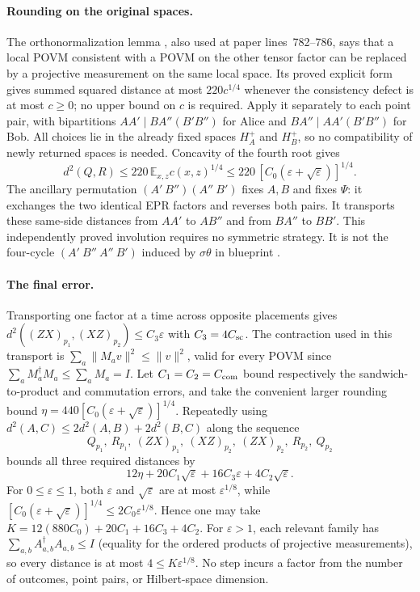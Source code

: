 \documentclass[11pt]{article}
\begin{document}
\paragraph{Rounding on the original spaces.}
The orthonormalization lemma , also used at paper
lines~782--786, says that a local POVM consistent with a POVM on the other
tensor factor can be replaced by a projective measurement on the same local
space.  Its proved explicit form gives summed squared distance at most
$220c^{1/4}$ whenever the consistency defect is at most $c\geq0$; no upper
bound on $c$ is required.  Apply it separately to each point pair, with
bipartitions $AA'\mid BA''(B'B'')$ for Alice and
$BA''\mid AA'(B'B'')$ for Bob.  All choices lie in the already fixed spaces
$H_A^+$ and $H_B^+$, so no compatibility of newly returned spaces is needed.
Concavity of the fourth root gives
\[
 d^2(Q,R)\leq220\,\mathbb E_{x,z}c(x,z)^{1/4}
 \leq220\,[C_0(\varepsilon+\sqrt\varepsilon)]^{1/4}.
\]
The ancillary permutation $(A'\ B'')(A''\ B')$ fixes $A,B$ and fixes
$\Psi$: it exchanges the two identical EPR factors and reverses both pairs.
It transports these same-side distances from $AA'$ to $AB''$ and from $BA''$
to $BB'$.  This independently proved involution requires no symmetric
strategy.  It is not the four-cycle $(A'\ B''\ A''\ B')$ induced by
$\sigma\theta$ in blueprint .

\paragraph{The final error.}
Transporting one factor at a time across opposite placements gives
$d^2((ZX)_{p_1},(XZ)_{p_2})\leq C_3\varepsilon$ with $C_3=4C_{\rm sc}$.
The contraction used in this transport is
$\sum_a\|M_av\|^2\leq\|v\|^2$, valid for every POVM since
$\sum_a M_a^\dagger M_a\leq\sum_a M_a=I$.
Let $C_1=C_2=C_{\rm com}$ bound respectively the sandwich-to-product and
commutation errors, and take the convenient larger rounding bound
$\eta=440[C_0(\varepsilon+\sqrt\varepsilon)]^{1/4}$.
Repeatedly using $d^2(A,C)\leq2d^2(A,B)+2d^2(B,C)$ along the sequence
\[
 Q_{p_1},\ R_{p_1},\ (ZX)_{p_1},\ (XZ)_{p_2},\ (ZX)_{p_2},\ R_{p_2},\ Q_{p_2}
\]
bounds all three required distances by
\[
 12\eta+20C_1\sqrt\varepsilon+16C_3\varepsilon+4C_2\sqrt\varepsilon.
\]
For $0\leq\varepsilon\leq1$, both $\varepsilon$ and $\sqrt\varepsilon$ are
at most $\varepsilon^{1/8}$, while
$[C_0(\varepsilon+\sqrt\varepsilon)]^{1/4}
 \leq2C_0\varepsilon^{1/8}$.
Hence one may take $K=12(880C_0)+20C_1+16C_3+4C_2$.
For $\varepsilon>1$, each relevant family has
$\sum_{a,b}A_{a,b}^\dagger A_{a,b}\leq I$ (equality for the ordered products
of projective measurements), so every distance is at most $4\leq
K\varepsilon^{1/8}$.  No step incurs a factor from the number of outcomes,
point pairs, or Hilbert-space dimension.
\end{document}
